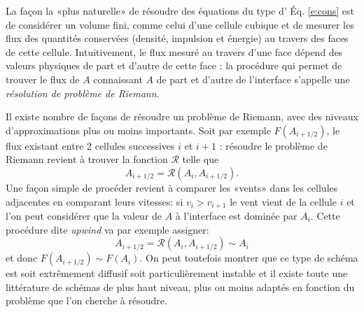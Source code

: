 La façon la «plus naturelle» de résoudre des équations du type d’ Éq. \ref{e:cons} est de considérer un volume fini, comme celui d'une cellule cubique et de mesurer les flux des quantités conservées (densité, impulsion et énergie) au travers des faces de cette cellule. Intuitivement, le flux mesuré au travers d'une face dépend des valeurs physiques de part et d'autre de cette face : la procédure qui permet de trouver le flux de $A$ connaissant $A$ de part et d'autre de l'interface s'appelle une \textit{résolution de problème de Riemann}.

 Il existe nombre de façons de résoudre un problème de Riemann, avec des niveaux d'approximations plus ou moins importants. Soit par exemple $F(A_{i+1/2})$, le flux existant entre 2 cellules successives $i$ et $i+1$ : résoudre le problème de Riemann revient à trouver la fonction $\mathcal R$ telle que
 \begin{equation}
 A_{i+1/2}=\mathcal{R}(A_i, A_{i+1/2}).
 \end{equation}
 Une façon simple de procéder revient à comparer les «vents» dans les cellules adjacentes en comparant leurs vitesses: si $v_i>v_{i+1}$ le vent vient de la cellule $i$ et l’on peut considérer que la valeur de $A$ à l'interface est dominée par $A_i$. Cette procédure dite \textit{upwind} va par exemple assigner:
  \begin{equation}
 A_{i+1/2}=\mathcal{R}(A_i, A_{i+1/2})\sim A_i
 \end{equation}
 et donc $F(A_{i+1/2})\sim F(A_{i})$. On peut toutefois montrer que ce type de schéma est soit extrêmement diffusif soit particulièrement instable et il existe toute une littérature de schémas de plus haut niveau, plus ou moins adaptés en fonction du problème que l'on cherche à résoudre.
 
